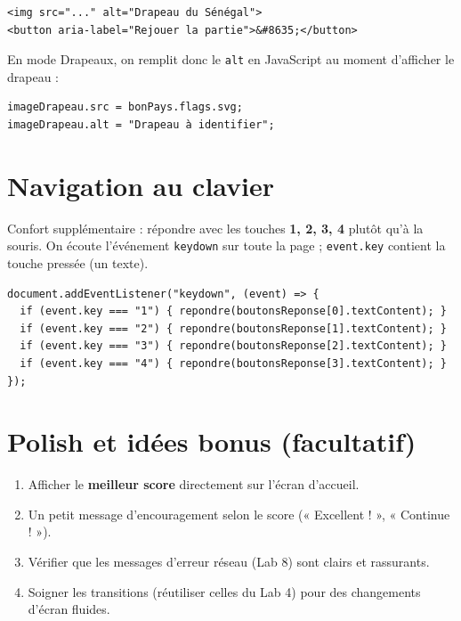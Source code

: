 \documentclass[11pt,a4paper]{article}
\newcommand{\code}[1]{\texttt{#1}}
\begin{document}
\begin{lstlisting}[style=html]
<img src="..." alt="Drapeau du Sénégal">
<button aria-label="Rejouer la partie">&#8635;</button>
\end{lstlisting}

En mode Drapeaux, on remplit donc le \code{alt} en JavaScript au moment d'afficher le drapeau :
\begin{lstlisting}[style=js]
imageDrapeau.src = bonPays.flags.svg;
imageDrapeau.alt = "Drapeau à identifier";
\end{lstlisting}

\section{Navigation au clavier}

Confort supplémentaire : répondre avec les touches \textbf{1, 2, 3, 4} plutôt qu'à la souris. On écoute l'événement \code{keydown} sur toute la page ; \code{event.key} contient la touche pressée (un texte).

\begin{lstlisting}[style=js]
document.addEventListener("keydown", (event) => {
  if (event.key === "1") { repondre(boutonsReponse[0].textContent); }
  if (event.key === "2") { repondre(boutonsReponse[1].textContent); }
  if (event.key === "3") { repondre(boutonsReponse[2].textContent); }
  if (event.key === "4") { repondre(boutonsReponse[3].textContent); }
});
\end{lstlisting}

\section{Polish et idées bonus (facultatif)}

\begin{objectifbox}
\begin{enumerate}[leftmargin=*,noitemsep]
  \item Afficher le \textbf{meilleur score} directement sur l'écran d'accueil.
  \item Un petit message d'encouragement selon le score (« Excellent ! », « Continue ! »).
  \item Vérifier que les messages d'erreur réseau (Lab 8) sont clairs et rassurants.
  \item Soigner les transitions (réutiliser celles du Lab 4) pour des changements d'écran fluides.
\end{enumerate}
\end{objectifbox}
\end{document}
